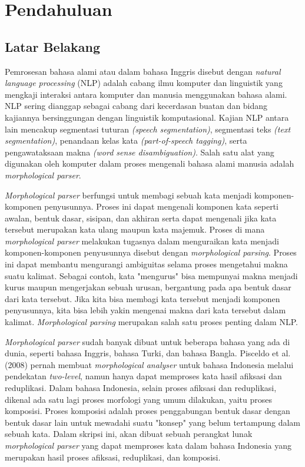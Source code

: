 \chapter{Pendahuluan}
\label{chap:pendahuluan}

\section{Latar Belakang}
\label{sec:latarBelakang}

Pemrosesan bahasa alami atau dalam bahasa Inggris disebut dengan {\it natural language processing} (NLP) adalah cabang ilmu komputer dan linguistik yang mengkaji interaksi antara komputer dan manusia menggunakan bahasa alami. NLP sering dianggap sebagai cabang dari kecerdasan buatan dan bidang kajiannya bersinggungan dengan linguistik komputasional. Kajian NLP antara lain mencakup segmentasi tuturan {\it (speech segmentation)}, segmentasi teks {\it (text segmentation)}, penandaan kelas kata {\it (part-of-speech tagging)}, serta pengawataksaan makna {\it (word sense disambiguation)}. Salah satu alat yang digunakan oleh komputer dalam proses mengenali bahasa alami manusia adalah {\it morphological parser}.

{\it Morphological parser} berfungsi untuk membagi sebuah kata menjadi komponen-komponen penyusunnya. Proses ini dapat mengenali komponen kata seperti awalan, bentuk dasar, sisipan, dan akhiran serta dapat mengenali jika kata tersebut merupakan kata ulang maupun kata majemuk. Proses di mana {\it morphological parser} melakukan tugasnya dalam menguraikan kata menjadi komponen-komponen penyusunnya disebut dengan {\it morphological parsing}. Proses ini dapat membantu mengurangi ambiguitas selama proses mengetahui makna suatu kalimat. Sebagai contoh, kata "mengurus" bisa mempunyai makna menjadi kurus maupun mengerjakan sebuah urusan, bergantung pada apa bentuk dasar dari kata tersebut. Jika kita bisa membagi kata tersebut menjadi komponen penyusunnya, kita bisa lebih yakin mengenai makna dari kata tersebut dalam kalimat. {\it Morphological parsing} merupakan salah satu proses penting dalam NLP.

{\it Morphological parser} sudah banyak dibuat untuk beberapa bahasa yang ada di dunia, seperti bahasa Inggris, bahasa Turki\cite{hasim:08:turkish}, dan bahasa Bangla\cite{sajib:10:bangla}. Pisceldo et al. (2008) pernah membuat \textit{morphological analyser} untuk bahasa Indonesia melalui pendekatan \textit{two-level}, namun hanya dapat memproses kata hasil afiksasi dan reduplikasi. Dalam bahasa Indonesia, selain proses afiksasi dan reduplikasi, dikenal ada satu lagi proses morfologi yang umum dilakukan, yaitu proses komposisi. Proses komposisi adalah proses penggabungan bentuk dasar dengan bentuk dasar lain untuk mewadahi suatu "konsep" yang belum tertampung dalam sebuah kata\cite{chaer:08:morfologi}. Dalam skripsi ini, akan dibuat sebuah perangkat lunak {\it morphological parser} yang dapat memproses kata dalam bahasa Indonesia yang merupakan hasil proses afiksasi, reduplikasi, dan komposisi.

